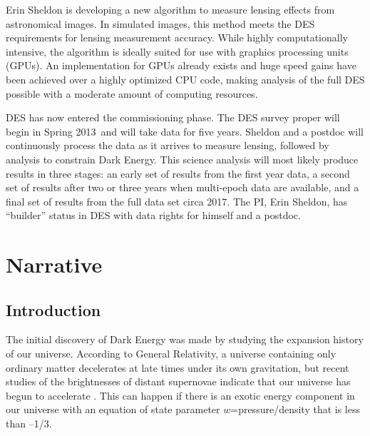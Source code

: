 \documentclass[12pt]{article}
\newcommand{\surveyproper}{Spring 2013}
\begin{document}
Erin Sheldon is developing a new algorithm to measure lensing effects from
astronomical images.  In simulated images, this method meets the DES
requirements for lensing measurement accuracy. While highly computationally
intensive, the algorithm is ideally suited for use with graphics processing
units (GPUs). An implementation for GPUs already exists and huge speed gains
have been achieved over a highly optimized CPU code, making analysis of the
full DES possible with a moderate amount of computing resources.

DES has now entered the commissioning phase.  The DES survey proper will begin
in \surveyproper\ and will take data for five years. Sheldon and a postdoc will
continuously process the data as it arrives to measure lensing, followed by
analysis to constrain Dark Energy.  This science analysis will most likely
produce results in three stages: an early set of results from the first year
data, a second set of results after two or three years when multi-epoch data
are available, and a final set of results from the full data set circa 2017.
The PI, Erin Sheldon, has ``builder'' status in DES with data rights for
himself and a postdoc. 

\newpage

\setcounter{page}{1}
\tableofcontents
\newpage
\section*{Narrative}
\setcounter{section}{1}
\subsection{Introduction}

The initial discovery of Dark Energy was made by studying the expansion history
of our universe.  According to General Relativity, a universe containing only
ordinary matter decelerates at late times under its own gravitation, but recent
studies of the brightnesses of distant supernovae indicate that our universe
has begun to accelerate \cite{Riess98,Perlmutter99}.  This can happen if there
is an exotic energy component in our universe with an equation of state
parameter $w$=pressure/density that is less than --1/3.
\end{document}
